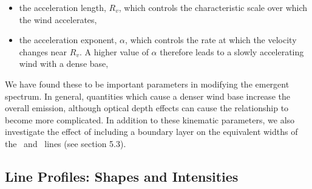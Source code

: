\documentclass[preprint, a4paper, 11pt]{aastex}
\begin{document}
\begin{itemize}
 	\item the acceleration length, $R_v$, which controls the characteristic scale
 	over which the wind accelerates,
 	\item the acceleration exponent, $\alpha$, which controls the rate 
 	at which the velocity changes near $R_v$. 
 	A higher value of $\alpha$ therefore leads to a slowly accelerating 
 	wind with a dense base,
 \end{itemize} 

We have found these to be important parameters in modifying 
the emergent spectrum.
In general, quantities which cause a denser wind base increase
the overall emission, although optical depth effects can cause 
the relationship to become more complicated. In addition to these 
kinematic parameters, we also investigate the effect of 
including a boundary layer on the equivalent widths of the 
\civfull\ and \heiiuv\ lines (see section 5.3).



\subsection{Line Profiles: Shapes and Intensities}



\end{document}
